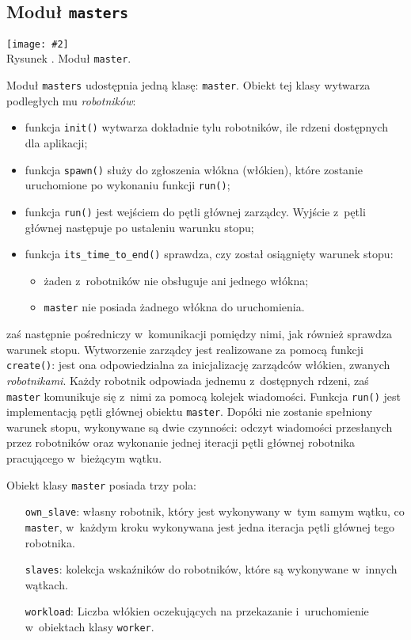 \documentclass[12pt]{mwart}
\newcommand{\code}{\texttt}
\newcommand{\procbr}{()}
\newcounter{figmain}
\newcommand{\myownfigure}[4]{ \newcounter{#1} \setcounter{#1}{\value{figmain}} \addtocounter{figmain}{1} \begin{center} \label{fig:#1} \centering \texttt{[image: \#2]}\\ \nopagebreak[4] Rysunek \arabic{#1}. #3. \end{center}}
\begin{document}
\subsection{Moduł \code{masters}}
    \myownfigure{Master}{Master.png}{Moduł \code{master}}{.7}
%
\indent
  Moduł \code{masters} udostępnia jedną klasę: \code{master}.
  Obiekt tej klasy wytwarza podległych mu \emph{robotników}:  
  \begin{itemize}
    \item funkcja \code{init()} wytwarza dokładnie tylu robotników, ile rdzeni dostępnych dla aplikacji;
    \item funkcja \code{spawn()} służy do zgłoszenia włókna (włókien), które zostanie uruchomione po wykonaniu funkcji \code{run()};
    \item funkcja \code{run()} jest wejściem do pętli głównej zarządcy. Wyjście z~pętli głównej następuje po ustaleniu warunku stopu;
    \item funkcja \code{its\_time\_to\_end()} sprawdza, czy został osiągnięty warunek stopu:
      \begin{itemize}
        \item żaden z~robotników nie obsługuje ani jednego włókna;
        \item \code{master} nie posiada żadnego włókna do uruchomienia.
      \end{itemize}
  \end{itemize}
  zaś następnie pośredniczy w~komunikacji pomiędzy nimi, jak również sprawdza warunek stopu.
  Wytworzenie zarządcy jest realizowane za pomocą funkcji \code{create()}: 
  jest ona odpowiedzialna za inicjalizację zarządców włókien, zwanych \emph{robotnikami}.
  Każdy robotnik odpowiada jednemu z~dostępnych rdzeni, zaś
  \code{master} komunikuje się z~nimi za pomocą kolejek wiadomości.
  Funkcja \code{run\procbr} jest implementacją pętli głównej obiektu \code{master}. Dopóki nie zostanie spełniony warunek stopu,
  wykonywane są dwie czynności: odczyt wiadomości przesłanych przez robotników oraz wykonanie jednej iteracji pętli głównej
  robotnika pracującego w~bieżącym wątku.
\par
\indent
  Obiekt klasy \code{master} posiada trzy pola:
  \begin{itemize}
    \item[\code{own\_slave}:] własny robotnik, który jest wykonywany w~tym samym wątku, co \code{master}, 
      w~każdym kroku wykonywana jest jedna iteracja pętli głównej tego robotnika.
    \item[\code{slaves}:] kolekcja wskaźników do robotników, które są wykonywane w~innych wątkach.
    \item[\code{workload}:] Liczba włókien oczekujących na przekazanie i~uruchomienie w~obiektach klasy \code{worker}.
  \end{itemize}
\par
\end{document}
